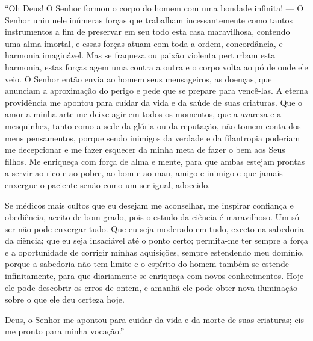 ``Oh Deus! O Senhor formou o corpo do homem com uma bondade infinita!
--- O Senhor uniu nele inúmeras forças que trabalham incessantemente
como tantos instrumentos a fim de preservar em seu todo esta casa
maravilhosa, contendo uma alma imortal, e essas forças atuam com toda a
ordem, concordância, e harmonia imaginável. Mas se fraqueza ou paixão
violenta perturbam esta harmonia, estas forças agem uma contra a outra
e o corpo volta ao pó de onde ele veio. O Senhor então envia ao homem
seus mensageiros, as doenças, que anunciam a aproximação do perigo e
pede que se prepare para vencê-las. A eterna providência me apontou para
cuidar da vida e da saúde de suas criaturas. Que o amor a minha arte me
deixe agir em todos os momentos, que a avareza e a mesquinhez, tanto
como a sede da glória ou da reputação, não tomem conta dos meus
pensamentos, porque sendo inimigos da verdade e da filantropia poderiam
me decepcionar e me fazer esquecer da minha meta de fazer o bem aos Seus
filhos. Me enriqueça com força de alma e mente, para que ambas estejam
prontas a servir ao rico e ao pobre, ao bom e ao mau, amigo e inimigo e
que jamais enxergue o paciente senão como um ser igual, adoecido.

Se médicos mais cultos que eu desejam me aconselhar, me inspirar
confiança e obediência, aceito de bom grado, pois o estudo da ciência é
maravilhoso. Um só ser não pode enxergar tudo. Que eu seja moderado em
tudo, exceto na sabedoria da ciência; que eu seja insaciável até o ponto
certo; permita-me ter sempre a força e a oportunidade de corrigir
minhas aquisições, sempre estendendo meu domínio, porque a sabedoria
não tem limite e o espírito do homem também se estende infinitamente,
para que diariamente se enriqueça com novos conhecimentos. Hoje ele
pode descobrir os erros de ontem, e amanhã ele pode obter nova
iluminação sobre o que ele deu certeza hoje.

Deus, o Senhor me apontou para cuidar da vida e da morte de suas
criaturas; eis-me pronto para minha vocação.''

